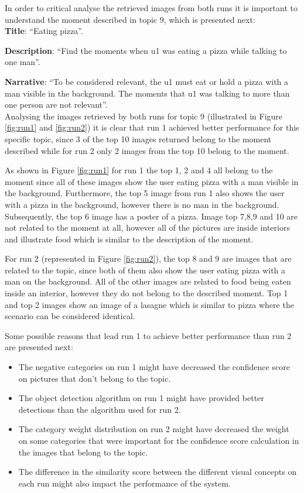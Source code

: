 In order to critical analyse the retrieved images from both runs it is important to understand the moment described in topic 9, which is presented next:\\



\textbf{Title}: \enquote{Eating pizza}.

\textbf{Description}: \enquote{Find the moments when u1 was eating a pizza
while talking to one man}.

\textbf{Narrative}: \enquote{To be considered relevant, the u1 must eat or
hold a pizza with a man visible in the background. The moments that
u1 was talking to more than one person are not relevant}.\\


Analysing the images retrieved by both runs for topic 9 (illustrated in Figure \ref{fig:run1} and \ref{fig:run2}) it is clear that run 1 achieved better performance for this specific topic, since 3 of the top 10 images returned belong to the moment described while for run 2 only 2 images from the top 10 belong to the moment. 


As shown in Figure \ref{fig:run1} for run 1 the  top 1, 2 and 4 all belong to the moment since all of these images show the user eating pizza with a man visible in the background. Furthermore, the top 5 image from run 1 also shows the user with a pizza in the background, however there is no man in the background. Subsequently, the top 6 image has a poster of a pizza. Image top 7,8,9 and 10 are not related to the moment at all, however all of the pictures are inside interiors and illustrate food which is similar to the description of the moment.

  
For run 2 (represented in Figure \ref{fig:run2}), the top 8 and 9 are images that are related to the topic, since both of them also show the user eating pizza with a man on the background. All of the other images are related to food being eaten inside an interior, however they do not belong to the described moment. Top 1 and top 2 images show an image of a lasagne which is similar to pizza where the scenario can be considered identical.

Some possible reasons that lead run 1 to achieve better performance than run 2 are presented next:

\begin{itemize}
  \itemsep0em
  \item The negative categories on run 1 might have decreased the confidence score on  pictures that don't belong to the topic.
  \item The object detection algorithm on run 1 might have provided better detections than the algorithm used for run 2.
  \item The category weight distribution on run 2 might have decreased the weight on some categories that were important for the confidence score calculation in the images that belong to the topic.
  \item The difference in the similarity score between the different visual concepts on each run might also impact the performance of the system.
\end{itemize}

